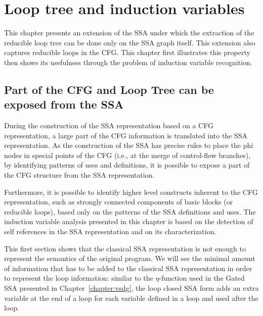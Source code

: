 \chapter{Loop tree and induction variables }
\graphicspath{{fig/}{loop_tree/fig/}{part3/loop_tree/fig/}}


\providecommand{\SSA}{SSA}
\providecommand{\CFG}{CFG}
\providecommand{\loopphi}{loop-$\phi$}
\providecommand{\closephi}{close-$\phi$}
\providecommand{\CHREC}[1]{\{#1\}}

This chapter presents an extension of the \SSA{} under which the
extraction of the reducible loop tree can be done only on the \SSA{}
graph itself.  This extension also captures reducible loops in the
CFG.  This chapter first illustrates this property then shows its
usefulness through the problem of induction variable recognition.

\section{Part of the \CFG{} and Loop Tree can be exposed from the \SSA{}}

During the construction of the \SSA{} representation based on a \CFG{}
representation, a large part of the \CFG{} information is translated
into the \SSA{} representation.  As the construction of the \SSA{} has
precise rules to place the phi nodes in special points of the \CFG{}
(i.e., at the merge of control-flow branches), by identifying patterns
of uses and definitions, it is possible to expose a part of the \CFG{} structure
from the \SSA{} representation.

Furthermore, it is possible to identify higher level constructs
inherent to the \CFG{} representation, such as strongly connected
components of basic blocks (or reducible loops), based only on the
patterns of the \SSA{} definitions and uses.  The induction variable
analysis presented in this chapter is based on the detection of self
references in the \SSA{} representation and on its characterization.

This first section shows that the classical \SSA{} representation is
not enough to represent the semantics of the original program.  We
will see the minimal amount of information that has to be added to the
classical \SSA{} representation in order to represent the loop
information: similar to the $\eta$-function used in the Gated \SSA{}
presented in Chapter~\ref{chapter:vsdg}, the loop closed \SSA{} form
adds an extra variable at the end of a loop for each variable defined
in a loop and used after the loop.

